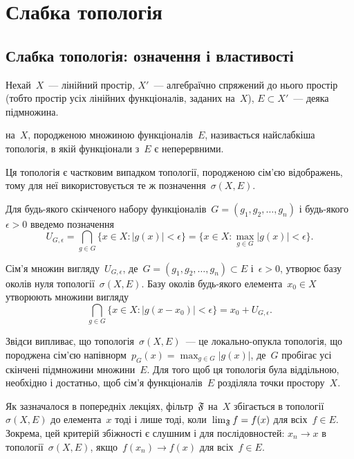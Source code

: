 \chapter{Слабка топологія}

\section{Слабка топологія: означення і властивості}

\begin{definition}
    Нехай~$X$~--- лінійний простір, $X'$~--- алгебраїчно спряжений до нього простір (тобто простір усіх лінійних функціоналів, заданих на~$X$), $E \subset X'$~--- деяка підмножина. 
    
     на~$X$, породженою множиною функціоналів~$E$, називається найслабкіша топологія, в якій функціонали з~$E$ є неперервними.
\end{definition}

\begin{remark}
    Ця топологія є частковим випадком топології, породженою сім'єю відображень, тому для неї використовується те ж позначення~$\sigma(X, E)$.
\end{remark}

Для будь-якого скінченого набору функціоналів~$G = (g_1, g_2, \dots, g_n)$ і будь-якого~$\epsilon > 0$ введемо позначення
\begin{equation*}
    U_{G, \epsilon} = \bigcap_{g \in G} \{x \in X: |g(x)| < \epsilon\} = \{x \in X: \max_{g \in G} |g(x)| < \epsilon\}.
\end{equation*}

Сім'я множин вигляду~$U_{G,\epsilon}$, де~$G = (g_1, g_2, \dots, g_n) \subset E$ і~$\epsilon > 0$, утворює базу околів нуля топології~$\sigma(X, E)$. Базу околів будь-якого елемента~$x_0 \in X$ утворюють множини вигляду 
\begin{equation*}
    \bigcap_{g \in G} \{x \in X: |g(x - x_0)| < \epsilon\} = x_0 + U_{G, \epsilon}.
\end{equation*}

Звідси випливає, що топологія~$\sigma(X, E)$~--- це локально-опукла топологія, що породжена сім'єю напівнорм~$p_G(x) = \max_{g \in G} |g(x)|$, де~$G$ пробігає усі скінчені підмножини множини~$E$. Для того щоб ця топологія була віддільною, необхідно і достатньо, щоб сім'я функціоналів~$E$ розділяла точки простору~$X$.

Як зазначалося в попередніх лекціях, фільтр~$\frak F$ на~$X$ збігається в топології~$\sigma(X, E)$ до елемента~$x$ тоді і лише тоді, коли~$\lim_{\frak F} f = f(x)$ для всіх~$f \in E$. Зокрема, цей критерій збіжності є слушним і для послідовностей: $x_n \to x$ в топології~$\sigma(X, E)$, якщо~$f(x_n) \to f(x)$ для всіх~$f \in E$.

